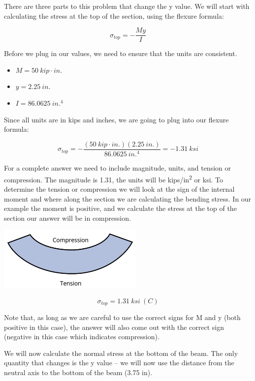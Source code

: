 \documentclass[
  letterpaper,
  DIV=11,
  numbers=noendperiod]{scrreprt}
\begin{document}
\begin{tcolorbox}
\begin{tcolorbox}
There are three parts to this problem that change the y value. We will
start with calculating the stress at the top of the section, using the
flexure formula:

\[
\sigma_{t o p}=-\frac{M y}{I}
\]

Before we plug in our values, we need to ensure that the units are
consistent.

\begin{itemize}
\item
  \(M = 50{~kip}\cdot{in.}\)
\item
  \(y = 2.25{~in.}\)
\item
  \(I = 86.0625{~in.^4}\)
\end{itemize}

Since all units are in kips and inches, we are going to plug into our
flexure formula:

\[
\sigma_{top}=-\frac{(50{~kip}\cdot{in.})(2.25{~in.})}{86.0625{~in.}^4}=-1.31{~ksi}
\]

For a complete answer we need to include magnitude, units, and tension
or compression. The magnitude is 1.31, the units will be
kips/in\textsuperscript{2} or ksi. To determine the tension or
compression we will look at the sign of the internal moment and where
along the section we are calculating the bending stress. In our example
the moment is positive, and we calculate the stress at the top of the
section our answer will be in compression.

\begin{center}
\includegraphics[width=2.79167in,height=\textheight]{images/CH9 PNGs/Example 9.1 part 4.png}
\end{center}

\[
\sigma_{top}=1.31{~ksi}~(C)
\]

Note that, as long as we are careful to use the correct signs for M and
y (both positive in this case), the answer will also come out with the
correct sign (negative in this case which indicates compression).

We will now calculate the normal stress at the bottom of the beam. The
only quantity that changes is the y value -- we will now use the
distance from the neutral axis to the bottom of the beam (3.75 in).


\end{tcolorbox}
\end{tcolorbox}
\end{document}
